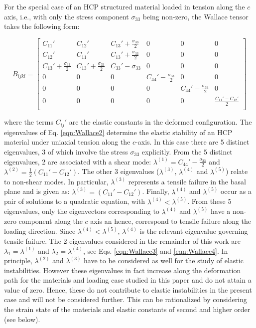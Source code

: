 \documentclass[showpacs,aps,floatfix,prb,reprint,superscriptaddress]{revtex4-1}
\begin{document}
For the special case of an HCP structured material loaded in tension along the $c$ axis, i.e., with only the stress component $\sigma_{33}$ being non-zero, the Wallace tensor  takes the following form:
\begin{widetext}
\begin{equation}
\label{eqn:Wallace2}
B_{ijkl} = \begin{bmatrix}
C_{11}' & C_{12}' & C_{13}' + \frac{\sigma_{33}}{2} & 0  & 0 & 0  \\[0.20em]
C_{12}' & C_{11}' & C_{13}' + \frac{\sigma_{33}}{2} & 0  & 0 & 0   \\[0.20em]
C_{13}' + \frac{\sigma_{33}}{2} & C_{13}' + \frac{\sigma_{33}}{2}  & C_{33}'-\sigma_{33}  & 0  & 0 & 0  \\[0.20em]
0  & 0 & 0 & C_{44}'-\frac{\sigma_{33}}{2} & 0 & 0 \\[0.20em]
0  & 0 & 0 & 0 & C_{44}'-\frac{\sigma_{33}}{2} & 0  \\[0.20em]
0  & 0 & 0 & 0 & 0 & \frac{C_{11}'-C_{12}'}{2}  \\[0.20em]
\end{bmatrix}
\end{equation}
\end{widetext}
where the terms $C_{ij}'$ are the elastic constants in the deformed configuration.  The eigenvalues of Eq. \ref{eqn:Wallace2} determine the elastic stability of an HCP material under uniaxial tension along the $c$-axis.  In this case there are 5 distinct eigenvalues, 3 of which involve the stress $\sigma_{33}$ explicitly. From the 5 distinct eigenvalues, 2 are associated with a shear mode: $\lambda^{(1)} = C_{44}' - \frac{\sigma_{33}}{2}$ and $\lambda^{(2)} = \frac{1}{2} \left(C_{11}'-C_{12}'\right)$. The other 3 eigenvalues ($\lambda^{(3)}$, $\lambda^{(4)}$ and $\lambda^{(5)}$) relate to non-shear modes. In particular, $\lambda^{(3)}$ represents a tensile failure in the basal plane and is given as: $\lambda^{(3)} = \left(C_{11}'-C_{12}'\right)$. Finally, $\lambda^{(4)}$ and $\lambda^{(5)}$ occur as a pair of solutions to a quadratic equation, with $\lambda^{(4)} < \lambda^{(5)}$. From these 5 eigenvalues, only the eigenvectors corresponding to $\lambda^{(4)}$ and $\lambda^{(5)}$ have a non-zero component along the $c$ axis an hence, correspond to tensile failure along the loading direction. Since $\lambda^{(4)} < \lambda^{(5)}$, $\lambda^{(4)}$ is the relevant eigenvalue governing tensile failure. The 2 eigenvalues considered in the remainder of this work are $\lambda_{1} = \lambda^{(1)}$ and $\lambda_{2} = \lambda^{(4)}$, see Eqs. \ref{eqn:Wallace3} and \ref{eqn:Wallace4}. In principle, $\lambda^{(2)}$ and $\lambda^{(3)}$ have to be considered as well for the study of elastic instabilities. However these eigenvalues in fact increase along the deformation path for the materials and loading case studied in this paper and do not attain a value of zero. Hence, these do not contribute to elastic instabilities in the present case and will not be considered further. This can be rationalized by considering the strain state of the materials and elastic constants of second and higher order (see below).
\end{document}
